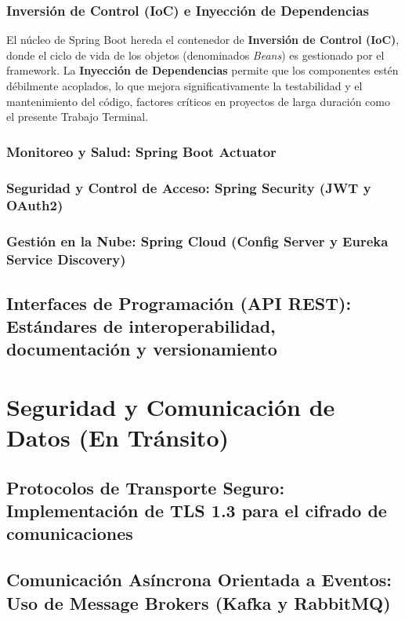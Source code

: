 \subsubsection{Inversión de Control (IoC) e Inyección de Dependencias}
El núcleo de Spring Boot hereda el contenedor de \textbf{Inversión de Control (IoC)}, donde el ciclo de vida de los objetos (denominados \textit{Beans}) es gestionado por el framework. La \textbf{Inyección de Dependencias} permite que los componentes estén débilmente acoplados, lo que mejora significativamente la testabilidad y el mantenimiento del código, factores críticos en proyectos de larga duración como el presente Trabajo Terminal.




\subsubsection{Monitoreo y Salud: Spring Boot Actuator}
\subsubsection{Seguridad y Control de Acceso: Spring Security (JWT y OAuth2)}
\subsubsection{Gestión en la Nube: Spring Cloud (Config Server y Eureka Service Discovery)}

\subsection{Interfaces de Programación (API REST): Estándares de interoperabilidad, documentación y versionamiento}

\section{Seguridad y Comunicación de Datos (En Tránsito)}
\subsection{Protocolos de Transporte Seguro: Implementación de TLS 1.3 para el cifrado de comunicaciones}
\subsection{Comunicación Asíncrona Orientada a Eventos: Uso de Message Brokers (Kafka y RabbitMQ)}
